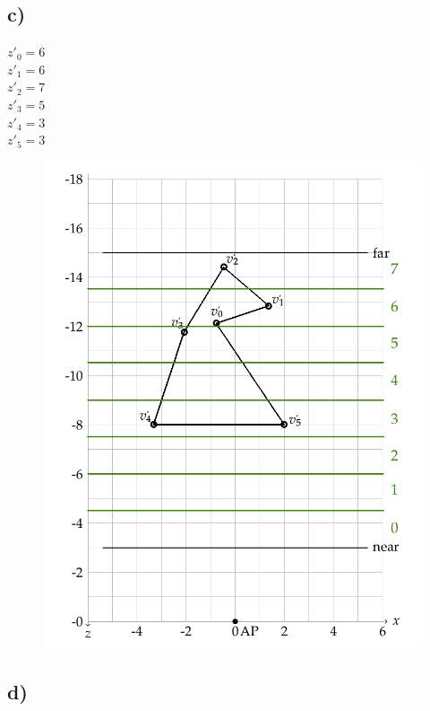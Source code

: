 \documentclass[a4paper,10pt,DIV=14]{article}
\begin{document}
\subsection{c)}
$z'_0 = 6$\\
$z'_1 = 6$\\
$z'_2 = 7$\\
$z'_3 = 5$\\
$z'_4 = 3$\\
$z'_5 = 3$
\begin{figure}[!htbp]
	\centering
	\includegraphics[width=1\linewidth]{2c}
\end{figure}
\subsection{d)}

\newcommand*\BitAnd{\mathrel{\&}}
\newcommand*\BitOr{\mathrel{|}}

\newcommand{\VecTwo}[2]{\begin{pmatrix} #1 \\ #2 \end{pmatrix}}
\end{document}
